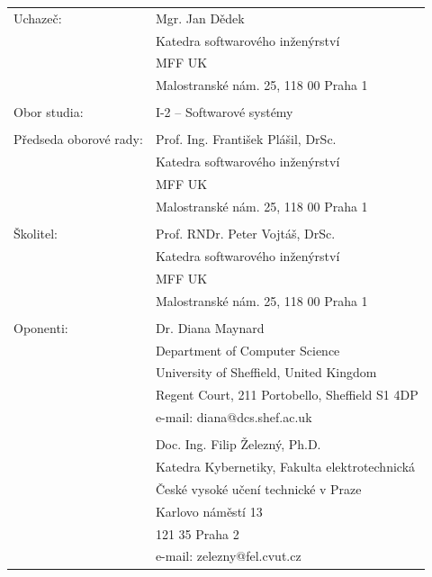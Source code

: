\documentclass[12pt,a4paper,twoside,notitlepage]{article}
\newcommand{\TheAuthor}{Mgr. Jan D\v{e}dek}
\newcommand{\TheSupervisor}{Prof. RNDr. Peter Vojt\'{a}\v{s}, DrSc.}
\begin{document}
\noindent
\begin{tabular}{ll}
{ Uchaze\v{c}:}&\TheAuthor \\
&Katedra softwarov\'{e}ho in\v{z}en\'{y}rstv\'{i}\\
&MFF UK\\
&Malostransk\'{e} n\'{a}m. 25, 118 00 Praha 1 \\
& \\
{ Obor studia:}&I-2 -- Softwarov\'{e} syst\'{e}my \\
& \\
{ P\v{r}edseda oborov\'{e} rady:}&Prof. Ing. Franti\v{s}ek Pl\'{a}\v{s}il, DrSc. \\
&Katedra softwarov\'{e}ho in\v{z}en\'{y}rstv\'{i}\\
&MFF UK\\
&Malostransk\'{e} n\'{a}m. 25, 118 00 Praha 1 \\
& \\
{ \v{S}kolitel:}&\TheSupervisor \\
&Katedra softwarov\'{e}ho in\v{z}en\'{y}rstv\'{i}\\
&MFF UK\\
&Malostransk\'{e} n\'{a}m. 25, 118 00 Praha 1 \\
&\\
{ Oponenti:}
&Dr. Diana Maynard\\
&Department of Computer Science\\
&University of Sheffield, United Kingdom\\
&Regent Court, 211 Portobello, Sheffield S1 4DP\\
&e-mail: diana@dcs.shef.ac.uk\\


\\&Doc. Ing. Filip \v{Z}elezn\'{y}, Ph.D.
\\&Katedra Kybernetiky, Fakulta elektrotechnick\'{a}
\\&\v{C}esk\'{e} vysok\'{e} u\v{c}en\'{i} technick\'{e} v Praze
\\&Karlovo n\'{a}m\v{e}st\'{i} 13
\\&121 35 Praha 2
\\&e-mail: zelezny@fel.cvut.cz



\end{tabular}
\end{document}
